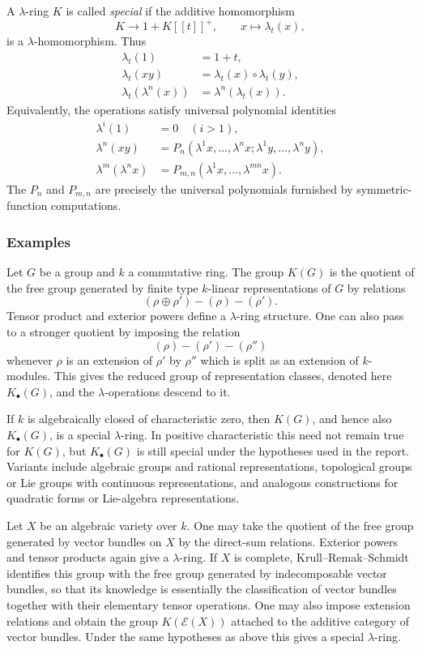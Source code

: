 \documentclass[14pt]{extarticle}
\newcommand{\cE}{\mathcal E}
\begin{document}
A $\lambda$-ring $K$ is called \emph{special} if the additive homomorphism
\[
   K\to 1+K[[t]]^+,
   \qquad x\mapsto\lambda_t(x),
\]
is a $\lambda$-homomorphism. Thus
\begin{align}\label{eq:speciallambda}
\lambda_t(1)&=1+t,\\
\lambda_t(xy)&=\lambda_t(x)\circ\lambda_t(y),\\
\lambda_t(\lambda^n(x))&=\lambda^n(\lambda_t(x)).
\end{align}
Equivalently, the operations satisfy universal polynomial identities
\begin{align*}
\lambda^i(1)&=0\quad(i>1),\\
\lambda^n(xy)&=P_n(\lambda^1x,\ldots,\lambda^nx;\lambda^1y,\ldots,\lambda^ny),\\
\lambda^m(\lambda^n x)&=P_{m,n}(\lambda^1x,\ldots,\lambda^{mn}x).
\end{align*}
The $P_n$ and $P_{m,n}$ are precisely the universal polynomials furnished by symmetric-function computations.

\subsubsection{Examples}

Let $G$ be a group and $k$ a commutative ring. The group $K(G)$ is the quotient of the free group generated by finite type $k$-linear representations of $G$ by relations
\[
   (\rho\oplus\rho')-(\rho)-(\rho').
\]
Tensor product and exterior powers define a $\lambda$-ring structure. One can also pass to a stronger quotient by imposing the relation
\[
   (\rho)-(\rho')-(\rho'')
\]
whenever $\rho$ is an extension of $\rho'$ by $\rho''$ which is split as an extension of $k$-modules. This gives the reduced group of representation classes, denoted here $K_{\bullet}(G)$, and the $\lambda$-operations descend to it.

If $k$ is algebraically closed of characteristic zero, then $K(G)$, and hence also $K_{\bullet}(G)$, is a special $\lambda$-ring. In positive characteristic this need not remain true for $K(G)$, but $K_{\bullet}(G)$ is still special under the hypotheses used in the report. Variants include algebraic groups and rational representations, topological groups or Lie groups with continuous representations, and analogous constructions for quadratic forms or Lie-algebra representations.

Let $X$ be an algebraic variety over $k$. One may take the quotient of the free group generated by vector bundles on $X$ by the direct-sum relations. Exterior powers and tensor products again give a $\lambda$-ring. If $X$ is complete, Krull--Remak--Schmidt identifies this group with the free group generated by indecomposable vector bundles, so that its knowledge is essentially the classification of vector bundles together with their elementary tensor operations. One may also impose extension relations and obtain the group $K(\cE(X))$ attached to the additive category of vector bundles. Under the same hypotheses as above this gives a special $\lambda$-ring.
\end{document}
